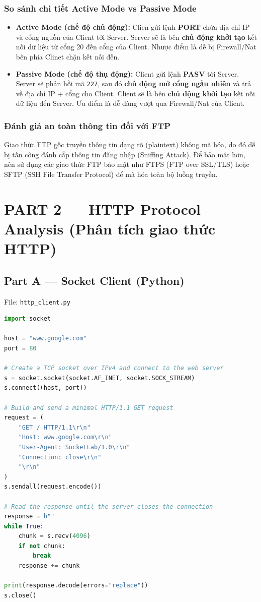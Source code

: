 \documentclass[12pt,a4paper]{article}
\begin{document}
\subsubsection{So sánh chi tiết Active Mode vs Passive Mode}
\begin{itemize}
  \item \textbf{Active Mode (chế độ chủ động):} Clien gửi lệnh \textbf{PORT} chứa địa chỉ IP và cổng nguồn của Client tới Server. Server sẽ là bên \textbf{chủ động khởi tạo} kết nối dữ liệu từ cổng 20 đến cổng của Client. Nhược điểm là dễ bị Firewall/Nat bên phía Clinet chặn kết nối đến.
  \item \textbf{Passive Mode (chế độ thụ động):} Client gửi lệnh \textbf{PASV} tới Server. Server sẽ phản hồi mã \texttt{227}, sau đó \textbf{chủ động mở cổng ngẫu nhiên} và trả về địa chỉ IP + cổng cho Client. Client sẽ là bên \textbf{chủ động khởi tạo} kết nối dữ liệu đến Server. Ưu điểm là dễ dàng vượt qua Firewall/Nat của Client.
\end{itemize}

\subsubsection{Đánh giá an toàn thông tin đối với FTP}
Giao thức FTP gốc truyền thông tin dạng rõ (plaintext) không mã hóa, do đó dễ bị tấn công đánh cắp thông tin đăng nhập (Sniffing Attack). Để bảo mật hơn, nên sử dụng các giao thức FTP bảo mật như FTPS (FTP over SSL/TLS) hoặc SFTP (SSH File Transfer Protocol) để mã hóa toàn bộ luồng truyền.

\section{PART 2 --- HTTP Protocol Analysis (Phân tích giao thức HTTP)}

\subsection{Part A --- Socket Client (Python)}
File: \texttt{http\_client.py}

\begin{lstlisting}[style=pystyle,language=Python]
import socket

host = "www.google.com"
port = 80

# Create a TCP socket over IPv4 and connect to the web server
s = socket.socket(socket.AF_INET, socket.SOCK_STREAM)
s.connect((host, port))

# Build and send a minimal HTTP/1.1 GET request
request = (
    "GET / HTTP/1.1\r\n"
    "Host: www.google.com\r\n"
    "User-Agent: SocketLab/1.0\r\n"
    "Connection: close\r\n"
    "\r\n"
)
s.sendall(request.encode())

# Read the response until the server closes the connection
response = b""
while True:
    chunk = s.recv(4096)
    if not chunk:
        break
    response += chunk

print(response.decode(errors="replace"))
s.close()
\end{lstlisting}
\end{document}
